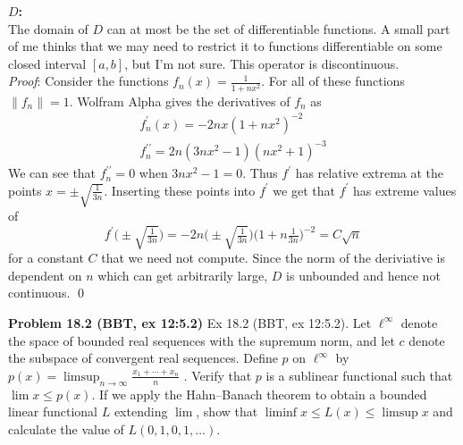 \documentclass[12pt]{article}
\newcommand{\problem}[1]{\hspace{-4 ex} \large \textbf{Problem #1} }
\newcommand{\norm}[1]{\left\lVert#1\right\rVert}
\renewenvironment{proof}{\hspace{-4 ex} \emph{Proof}:}{\qed}
\begin{document}
	\textbf{$D$:}\\
	The domain of $D$ can at most be the set of differentiable functions. A small part of me thinks that we may need to restrict it to functions differentiable on some closed interval $[a,b]$, but I'm not sure. This operator is discontinuous. \\
	\begin{proof}
		Consider the functions $f_n(x) = \frac{1}{1+nx^2}$. For all of these functions $\norm{f_n} = 1$. Wolfram Alpha gives the derivatives of $f_n$ as 
		\begin{align*}
			f_n^\prime(x) = -2nx(1+nx^2)^{-2} \\
			f_n^{\prime\prime} = 2n(3nx^2-1)(nx^2+1)^{-3}
		\end{align*} 
		We can see that $f_n^{\prime\prime} = 0$ when $3nx^2-1 = 0$. Thus $f^\prime$ has relative extrema at the points $x = \pm \sqrt{\frac{1}{3n}}$. Inserting these points into $f^\prime$ we get that $f^\prime$ has extreme values of
		$$
		f^\prime \Big(\pm \sqrt{\tfrac{1}{3n}} \Big) = -2n \Big(\pm \sqrt{\tfrac{1}{3n}} \Big) \Big(1+n\tfrac{1}{3n} \Big)^{-2} = C\sqrt{n}
		$$
		for a constant $C$ that we need not compute. Since the norm of the deriviative is dependent on $n$ which can get arbitrarily large, $D$ is unbounded and hence not continuous.
	\end{proof}

\problem{18.2 (BBT, ex 12:5.2)}
Ex 18.2 (BBT, ex 12:5.2). Let $\ell^\infty$ denote the space of bounded real sequences with the supremum norm, and let $c$ denote the subspace of convergent real sequences. Define $p$ on $\ell^\infty$ by
$p(x)=\limsup_{n\to\infty}\frac{x_1+\cdots+x_n}{n}$ .
Verify that $p$ is a sublinear functional such that $\lim x\leq p(x)$. If we apply the Hahn--Banach theorem to obtain a bounded linear functional $L$ extending $\lim$, show that $\liminf x\leq L(x)\leq\limsup x$ and calculate the value of $L(0,1,0,1,\ldots)$.
\end{document}
